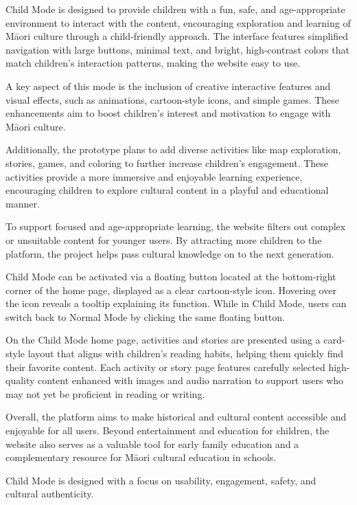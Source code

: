 Child Mode is designed to provide children with a fun, safe, and age-appropriate environment to interact with the content, encouraging exploration and learning of Māori culture through a child-friendly approach. The interface features simplified navigation with large buttons, minimal text, and bright, high-contrast colors that match children's interaction patterns, making the website easy to use.

A key aspect of this mode is the inclusion of creative interactive features and visual effects, such as animations, cartoon-style icons, and simple games. These enhancements aim to boost children's interest and motivation to engage with Māori culture.

Additionally, the prototype plans to add diverse activities like map exploration, stories, games, and coloring to further increase children's engagement. These activities provide a more immersive and enjoyable learning experience, encouraging children to explore cultural content in a playful and educational manner.

To support focused and age-appropriate learning, the website filters out complex or unsuitable content for younger users. By attracting more children to the platform, the project helps pass cultural knowledge on to the next generation.

Child Mode can be activated via a floating button located at the bottom-right corner of the home page, displayed as a clear cartoon-style icon. Hovering over the icon reveals a tooltip explaining its function. While in Child Mode, users can switch back to Normal Mode by clicking the same floating button.

On the Child Mode home page, activities and stories are presented using a card-style layout that aligns with children's reading habits, helping them quickly find their favorite content. Each activity or story page features carefully selected high-quality content enhanced with images and audio narration to support users who may not yet be proficient in reading or writing.

Overall, the platform aims to make historical and cultural content accessible and enjoyable for all users. Beyond entertainment and education for children, the website also serves as a valuable tool for early family education and a complementary resource for Māori cultural education in schools.

Child Mode is designed with a focus on usability, engagement, safety, and cultural authenticity.

